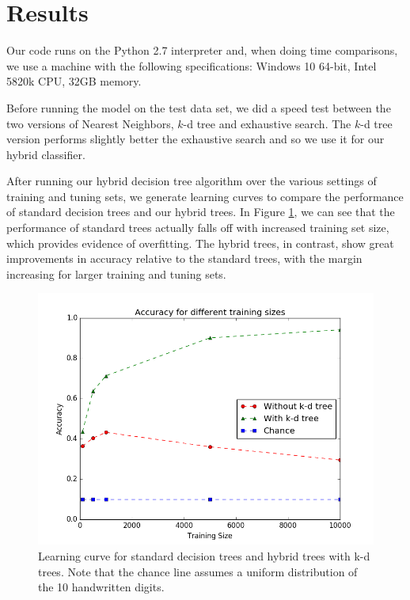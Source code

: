 \section{Results}
Our code runs on the Python 2.7 interpreter and, when doing time comparisons, we use a machine with the following specifications: Windows 10 64-bit, Intel 5820k CPU, 32GB memory.

Before running the model on the test data set, we did a speed test between the two versions of Nearest Neighbors, $k$-d tree and exhaustive search. The $k$-d tree version performs slightly better the exhaustive search and so we use it for our hybrid classifier.

After running our hybrid decision tree algorithm over the various settings of training and tuning sets, we generate learning curves to compare the performance of standard decision trees and our hybrid trees.  In Figure \ref{fig:learn_curve}, we can see that the performance of standard trees actually falls off with increased training set size, which provides evidence of overfitting. The hybrid trees, in contrast, show great improvements in accuracy relative to the standard trees, with the margin increasing for larger training and tuning sets.

\begin{figure}
	\includegraphics[width=\linewidth]{Figures/learning_curve.png}
	\caption{Learning curve for standard decision trees and hybrid trees with k-d trees.  Note that the chance line assumes a uniform distribution of the 10 handwritten digits.}
	\label{fig:learn_curve}
\end{figure}


